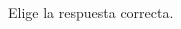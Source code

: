 Elige la respuesta correcta.

\begin{multicols}{2}
    \begin{parts}









\end{parts}
\end{multicols}

